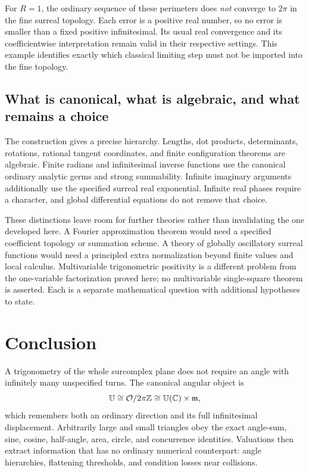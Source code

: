 \documentclass[11pt,letterpaper]{article}
\theoremstyle{definition}
\theoremstyle{remark}
\newcommand{\OO}{\mathcal O}\newcommand{\mm}{\mathfrak m}
\newcommand{\U}{\mathbb U}\newcommand{\PP}{\mathbb P}
\numberwithin{equation}{section}
\begin{document}
For $R=1$, the ordinary sequence of these perimeters does \emph{not} converge to $2\pi$ in the fine surreal topology. Each error is a positive real number, so no error is smaller than a fixed positive infinitesimal. Its usual real convergence and its coefficientwise interpretation remain valid in their respective settings. This example identifies exactly which classical limiting step must not be imported into the fine topology.

\subsection{What is canonical, what is algebraic, and what remains a choice}
The construction gives a precise hierarchy. Lengths, dot products, determinants, rotations, rational tangent coordinates, and finite configuration theorems are algebraic. Finite radians and infinitesimal inverse functions use the canonical ordinary analytic germs and strong summability. Infinite imaginary arguments additionally use the specified surreal real exponential. Infinite real phases require a character, and global differential equations do not remove that choice.

These distinctions leave room for further theories rather than invalidating the one developed here. A Fourier approximation theorem would need a specified coefficient topology or summation scheme. A theory of globally oscillatory surreal functions would need a principled extra normalization beyond finite values and local calculus. Multivariable trigonometric positivity is a different problem from the one-variable factorization proved here; no multivariable single-square theorem is asserted. Each is a separate mathematical question with additional hypotheses to state.

\section{Conclusion}
A trigonometry of the whole surcomplex plane does not require an angle with infinitely many unspecified turns. The canonical angular object is
\[
 \U\cong\OO/2\pi\Z\cong\U(\C)\times\mm,
\]
which remembers both an ordinary direction and its full infinitesimal displacement. Arbitrarily large and small triangles obey the exact angle-sum, sine, cosine, half-angle, area, circle, and concurrence identities. Valuations then extract information that has no ordinary numerical counterpart: angle hierarchies, flattening thresholds, and condition losses near collisions.
\end{document}
